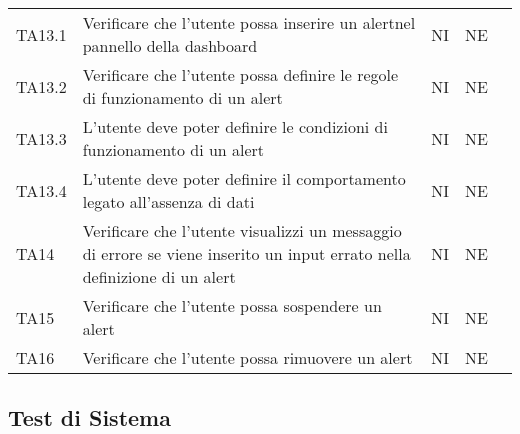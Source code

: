 \begin{longtable} {
		>{\centering}p{15mm} 
		>{\centering}p{79.5mm}
		>{\centering}p{15mm} 
		>{\centering}p{15mm}
		>{}p{0mm}}
	TA13.1 & Verificare che l'utente possa inserire un alert\glosp nel pannello della dashboard\glo & NI & NE  &\TBstrut \\ [2mm]
	TA13.2 & Verificare che l'utente possa definire le regole di funzionamento di un alert\glo & NI & NE  &\TBstrut \\ [2mm]
	TA13.3 & L'utente deve poter definire le condizioni di funzionamento di un alert\glo & NI & NE  &\TBstrut \\ [2mm]
	TA13.4 & L'utente deve poter definire il comportamento legato all'assenza di dati  & NI & NE  &\TBstrut \\ [2mm]
	TA14 & Verificare che l'utente visualizzi un messaggio di errore se viene inserito un input errato nella definizione di un alert\glo & NI & NE  &\TBstrut \\ [2mm]
	TA15 & Verificare che l'utente possa sospendere un alert\glo & NI & NE  &\TBstrut \\ [2mm]
	TA16 & Verificare che l'utente possa rimuovere un alert\glo & NI & NE  &\TBstrut \\ [2mm]
	
\end{longtable}


\subsection{Test di Sistema}


